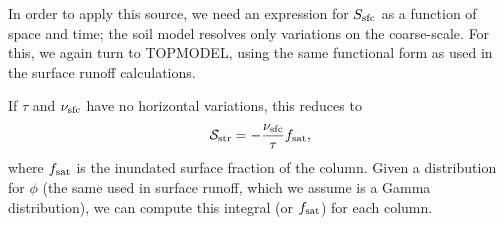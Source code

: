 \documentclass[twoside,10pt]{report}
\begin{document}
In order to apply this source, we need an expression for $S_{\rm sfc}$ as a function of space and time; the soil model resolves only variations on the coarse-scale. For this, we again turn to TOPMODEL, using the same functional form as used in the surface runoff calculations.

If $\tau$ and $\nu_{\rm sfc}$ have no horizontal variations, this reduces to
\begin{align}
        \mathcal{S_{\rm str}} = - \frac{\nu_{\rm sfc}}{\tau}f_{\rm sat},
\end{align}
where $f_{\rm sat}$ is the inundated surface fraction of the column. Given a distribution for $\phi$ (the same used in surface runoff, which we assume is a Gamma distribution), we can compute this integral (or $f_{\rm sat}$) for each column. 




\end{document}
